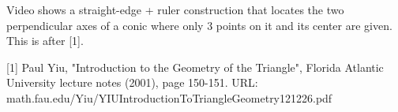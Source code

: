 Video shows a straight-edge + ruler construction that locates the two perpendicular axes of a conic where only 3 points on it and its center are given. This is after [1].

[1] Paul Yiu, "Introduction to the Geometry of the Triangle", Florida Atlantic University lecture notes (2001), page 150-151. URL: math.fau.edu/Yiu/YIUIntroductionToTriangleGeometry121226.pdf